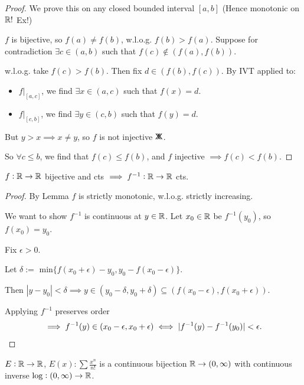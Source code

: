 \begin{proof}
We prove this on any closed bounded interval $[a,b]$ (Hence monotonic on $\mathbb{R}!$ Ex!)

$f$ is bijective, so $f(a) \neq f(b)$, w.l.o.g. $f(b) > f(a).$ Suppose for contradiction $\exists c \in (a,b)$ such that $f(c) \not\in (f(a),f(b)).$ 

w.l.o.g. take $f(c) > f(b)$. Then fix $d \in (f(b),f(c))$. By IVT applied to:
\begin{itemize} 
\item $f|_{[a,c]}$, we find $\exists x \in (a,c)$ such that $f(x) = d$. 
\item $f|_{[c,b]}$, we find $\exists y \in (c,b)$ such that $f(y) = d$.
	
\end{itemize}
But $y > x \implies x  \neq y$, so $f$ is not injective $\mathsf{X}\mkern-8.5mu\mathsf{X}$. 

So $\forall c \leq b$, we find that $f(c) \leq f(b)$, and $f$ injective $\implies f(c) < f(b)$. 
\end{proof}\vspace*{5pt}

\begin{theorem}
	$f: \mathbb{R} \to \mathbb{R}$ bijective and cts $\implies f^{-1}: \mathbb{R} \to \mathbb{R}$ cts.
\end{theorem}
\begin{proof}
By Lemma $f$ is strictly monotonic, w.l.o.g. strictly increasing. 

We want to show $f^{-1}$ is continuous at $y\in\mathbb{R}$. Let $x_0 \in\mathbb{R}$ be $f^{-1}(y_0)$, so $f(x_0) = y_0$.

Fix $\epsilon > 0$.

Let $\delta :=$ min$\{f(x_0 + \epsilon) - y_0, y_0 - f(x_0 - \epsilon)\}$. 
 
 Then $|y -  y_0| < \delta \implies y \in (y_0 -\delta, y_0 + \delta) \subseteq (f(x_0 - \epsilon), f(x_0 + \epsilon))$. 
 
 Applying $f^{-1}$ preserves order \[\implies f^{-1}(y) \in (x_0 - \epsilon, x_0 + \epsilon) \iff |f^{-1}(y) - f^{-1}(y_0)| < \epsilon.\qedhere\]
\end{proof}\vspace*{5pt}

\begin{corollary}
$E:\mathbb{R} \to \mathbb{R}$, $E(x): \sum \frac{x^n}{n!}$ is a continuous bijection $\mathbb{R} \to (0,\infty)$ with continuous inverse $\log: (0,\infty) \to \mathbb{R}$. 	
\end{corollary}\vspace*{5pt}

